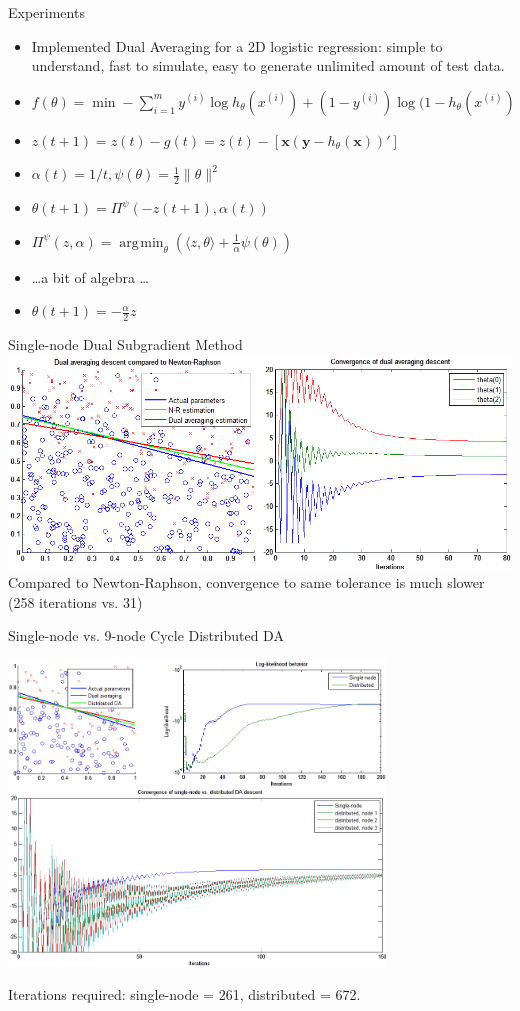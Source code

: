 \documentclass{beamer}
\DeclareMathOperator*{\argmin}{\arg\!\min}
\begin{document}
	\begin{frame}{Experiments}
		\begin{itemize}
			\item Implemented Dual Averaging for a 2D logistic regression: simple to understand,
				fast to simulate, easy to generate unlimited amount of test data.
			\item $f(\theta) = \min-\sum_{i=1}^{m} y^{(i)}\log h_\theta(x^{(i)}) + (1- y^{(i)})\log (1 - h_\theta(x^{(i)})$
			\item $z(t+1) = z(t) - g(t) = z(t) - [\mathbf{x}(\mathbf{y} - h_\theta(\mathbf{x}))']$
			\item $\alpha(t) = 1/t, \psi(\theta) = \frac{1}{2}\| \theta \|^2$
			\item $\theta(t+1) = \Pi^\psi(-z(t+1), \alpha(t))$
			\item $ \Pi^\psi(z, \alpha) = \argmin_{\theta}(\langle z, \theta \rangle + \frac{1}{\alpha}\psi(\theta))$
			\item \ldots a bit of algebra \ldots
			\item $\theta(t+1) = -\frac{\alpha}{2}z$			
		\end{itemize}
	\end{frame}	
	
	\begin{frame}{Single-node Dual Subgradient Method}
		 \includegraphics[width=\textwidth]{comp-vs-nr.png}\\
		 Compared to Newton-Raphson, convergence to same tolerance is much slower (258 iterations vs. 31)
	\end{frame}
	
	\begin{frame}{Single-node vs. 9-node Cycle Distributed DA}
		\centerline{\includegraphics[width=0.75\textwidth]{singlenode-vs-dist.png}}
		Iterations required: single-node = 261, distributed = 672.
	\end{frame}
	
\end{document}
